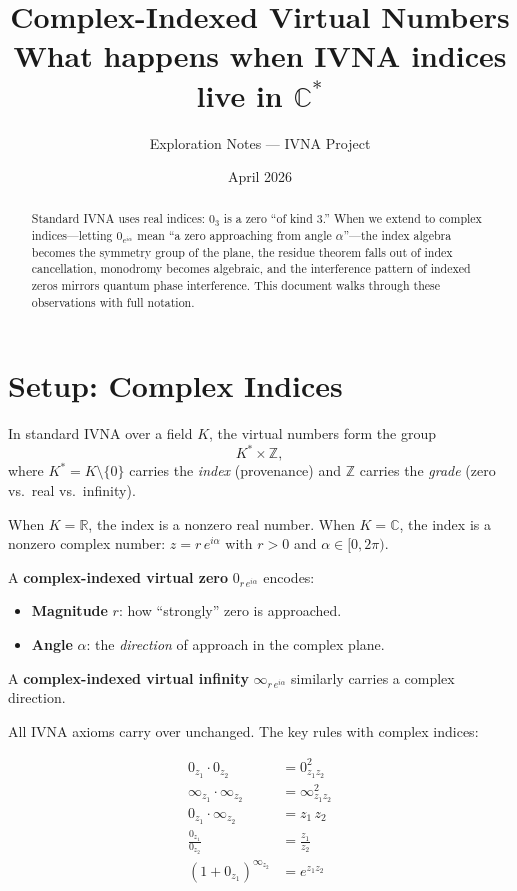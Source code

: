 \documentclass[11pt,a4paper]{article}
\title{\textbf{Complex-Indexed Virtual Numbers}\\[4pt]
\large What happens when IVNA indices live in $\mathbb{C}^*$}
\author{Exploration Notes — IVNA Project}
\date{April 2026}
\newcommand{\vi}[1]{0_{#1}}          %
\newcommand{\vinf}[1]{\infty_{#1}}   %
\begin{document}
\maketitle

\begin{abstract}
Standard IVNA uses real indices: $\vi{3}$ is a zero ``of kind 3.'' When we extend to complex indices---letting $\vi{e^{i\alpha}}$ mean ``a zero approaching from angle $\alpha$''---the index algebra becomes the symmetry group of the plane, the residue theorem falls out of index cancellation, monodromy becomes algebraic, and the interference pattern of indexed zeros mirrors quantum phase interference. This document walks through these observations with full notation.
\end{abstract}

\tableofcontents
\bigskip

\section{Setup: Complex Indices}

In standard IVNA over a field $K$, the virtual numbers form the group
\[
  K^* \times \mathbb{Z},
\]
where $K^* = K \setminus \{0\}$ carries the \emph{index} (provenance) and $\mathbb{Z}$ carries the \emph{grade} (zero vs.\ real vs.\ infinity).

When $K = \mathbb{R}$, the index is a nonzero real number.
When $K = \mathbb{C}$, the index is a nonzero complex number: $z = r\,e^{i\alpha}$ with $r > 0$ and $\alpha \in [0, 2\pi)$.

A \textbf{complex-indexed virtual zero} $\vi{r\,e^{i\alpha}}$ encodes:
\begin{itemize}[nosep]
  \item \textbf{Magnitude} $r$: how ``strongly'' zero is approached.
  \item \textbf{Angle} $\alpha$: the \emph{direction} of approach in the complex plane.
\end{itemize}

A \textbf{complex-indexed virtual infinity} $\vinf{r\,e^{i\alpha}}$ similarly carries a complex direction.

All IVNA axioms carry over unchanged. The key rules with complex indices:

\begin{align}
  \vi{z_1} \cdot \vi{z_2} &= 0^2_{z_1 z_2} \tag{A1} \\[3pt]
  \vinf{z_1} \cdot \vinf{z_2} &= \infty^2_{z_1 z_2} \tag{A2} \\[3pt]
  \vi{z_1} \cdot \vinf{z_2} &= z_1\, z_2 \tag{A3: product rule} \\[3pt]
  \frac{\vi{z_1}}{\vi{z_2}} &= \frac{z_1}{z_2} \tag{A8: zero-division} \\[3pt]
  (1 + \vi{z_1})^{\vinf{z_2}} &= e^{z_1 z_2} \tag{A-EXP}
\end{align}
\end{document}
